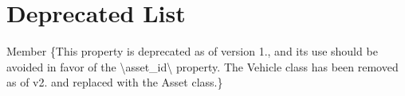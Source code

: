 \chapter{Deprecated List}
\hypertarget{deprecated}{}\label{deprecated}

\begin{DoxyRefList}
\item[Member \doxylink{classtransaction_1_1_transaction_ad325305c973277d29667703fd9d89b4d}{transaction.Transaction.vehicle\+\_\+id} ]\label{deprecated__deprecated000001}%
%
\{This property is deprecated as of version 1., and its use should be avoided in favor of the \textbackslash{}\textquotesingle{}asset\+\_\+id\textbackslash{}\textquotesingle{} property. The Vehicle class has been removed as of v2. and replaced with the Asset class.\} 
\end{DoxyRefList}